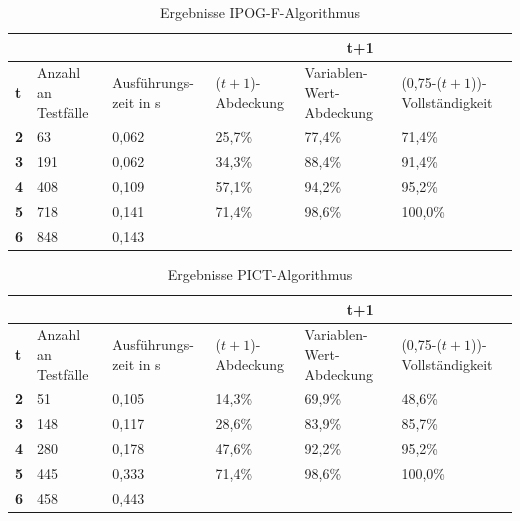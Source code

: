 \begin{table}[!htb]
\footnotesize
\begin{tabular}{|M{0.06\textwidth}|M{}|M{}||M{}|M{}|M{}|}
\hline
  &     &       &                                             \\ \hline
\textbf{t} & Anzahl an Testfälle & Ausführungs- zeit in s & ($t+1$)-Abdeckung & Variablen-Wert-Abdeckung & (0,75-($t+1$))-Vollständigkeit \\ \hline
\textbf{2} & 63  & 0,062 & 25,7\% & 77,4\% & 71,4\%  \\
\textbf{3} & 191 & 0,062 & 34,3\% & 88,4\% & 91,4\%  \\
\textbf{4} & 408 & 0,109 & 57,1\% & 94,2\% & 95,2\%  \\
\textbf{5} & 718 & 0,141 & 71,4\% & 98,6\% & 100,0\% \\
\textbf{6} & 848 & 0,143 &        &        &        \\ \hline
\end{tabular}
\normalsize
\caption{Ergebnisse IPOG-F-Algorithmus}
\label{tab:resultsIPOG-F}
\end{table}

\begin{table}[!htb]
\footnotesize
\begin{tabular}{|M{0.06\textwidth}|M{}|M{}||M{}|M{}|M{}|}
\hline
  &     &       &                                             \\ \hline
\textbf{t} & Anzahl an Testfälle & Ausführungs- zeit in s & ($t+1$)-Abdeckung & Variablen-Wert-Abdeckung & (0,75-($t+1$))-Vollständigkeit \\ \hline
\textbf{2} & 51  & 0,105 & 14,3\% & 69,9\% & 48,6\%  \\
\textbf{3} & 148 & 0,117 & 28,6\% & 83,9\% & 85,7\%  \\
\textbf{4} & 280 & 0,178 & 47,6\% & 92,2\% & 95,2\%  \\
\textbf{5} & 445 & 0,333 & 71,4\% & 98,6\% & 100,0\% \\
\textbf{6} & 458 & 0,443 &        &        &        \\ \hline       
\end{tabular}
\normalsize
\caption{Ergebnisse PICT-Algorithmus}
\label{tab:resultsPICT}
\end{table}

